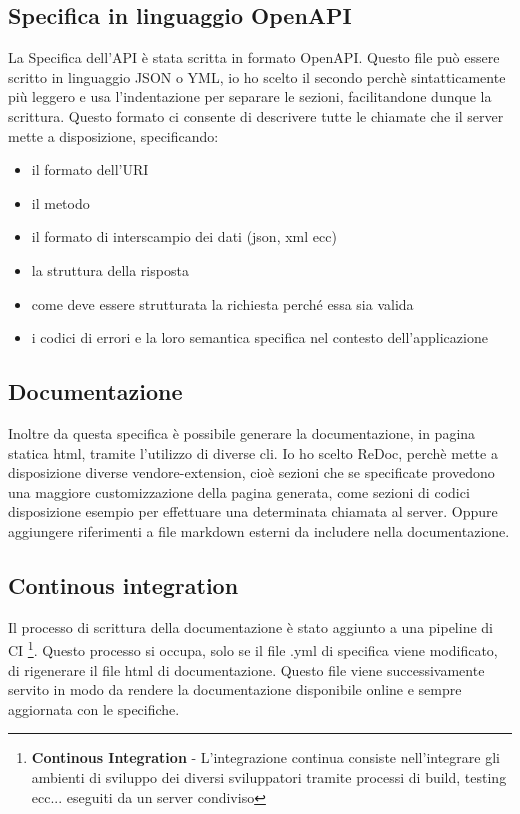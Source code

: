             \subsection{Specifica in linguaggio OpenAPI\label{openapi}}
                La Specifica dell'API è stata scritta in formato OpenAPI.
                Questo file può essere scritto in linguaggio JSON o YML, io ho scelto il secondo perchè
                sintatticamente più leggero e usa l'indentazione per separare le sezioni, facilitandone dunque la scrittura. 
                Questo formato ci consente di descrivere tutte le chiamate che il server 
                mette a disposizione, specificando:
                \begin{itemize}
                    \item il formato dell'URI 
                    \item il metodo
                    \item il formato di interscampio dei dati (json, xml ecc) 
                    \item la struttura della risposta
                    \item come deve essere strutturata la richiesta perch\'e essa sia valida
                        \item i codici di errori e la loro semantica specifica nel contesto dell'applicazione
                \end{itemize}
                
            \subsection{Documentazione\label{apidoc}}
                Inoltre da questa specifica è possibile generare la documentazione, in pagina statica html,
                tramite l'utilizzo di diverse cli.
                Io ho scelto ReDoc, perchè mette a disposizione diverse vendore-extension, cioè sezioni che
                se specificate provedono una maggiore customizzazione della pagina generata, come sezioni di codici disposizione
                esempio per effettuare una determinata chiamata al server.
                Oppure aggiungere riferimenti a file markdown esterni da includere nella documentazione.
                
            \subsection{Continous integration}
                Il processo di scrittura della documentazione è stato aggiunto a una pipeline di CI
                \footnote{\textbf{Continous Integration} - L'integrazione continua consiste nell'integrare gli ambienti di sviluppo dei diversi sviluppatori tramite processi di build, testing ecc... eseguiti da un server condiviso}.
                Questo processo si occupa, solo se il file .yml di specifica viene modificato, di 
                rigenerare il file html di documentazione.
                Questo file viene successivamente servito in modo da rendere la documentazione 
                disponibile online e sempre aggiornata con le specifiche.


